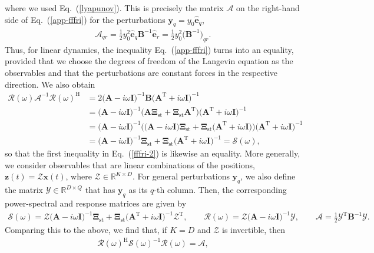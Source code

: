 \documentclass[aps,pre,twocolumn,superscriptaddress,notitlepage]{revtex4-2}
\newcommand{\nn}{\nonumber \\}
\newcommand{\n}{\nonumber}
\newcommand{\bmc}[1]{\bm{\mathcal{#1}}}
\renewcommand{\eqref}[1]{Eq.~(\ref{#1})}
\begin{document}
where we used \eqref{lyapunov}.
This is precisely the matrix $\bmc{A}$ on the right-hand side of \eqref{app-fffri} for the perturbations $\bm{y}_q = y_0 \hat{\bm{e}}_q$,
\begin{align}
\mathcal{A}_{qr} = \frac{1}{2} y_0^2 \hat{\bm{e}}_q \bm{B}^{-1} \hat{\bm{e}}_r = \frac{1}{2} y_0^2 \big(\bm{B}^{-1}\big)_{qr} .
\end{align}
Thus, for linear dynamics, the inequality \eqref{app-fffri} turns into an equality, provided that we choose the degrees of freedom of the Langevin equation as the observables and that the perturbations are constant forces in the respective direction.
We also obtain
\begin{align}
\bmc{R}(\omega) \bmc{A}^{-1} \bmc{R}(\omega)^\text{H} &= 2 \big(\bm{A} - i \omega \bm{I} \big)^{-1} \bm{B} \big(\bm{A}^\text{T} + i \omega \bm{I} \big)^{-1} \label{response-equality-3} \\
&= \big(\bm{A} - i \omega \bm{I} \big)^{-1} \big( \bm{A} \bm{\Xi}_\text{st} + \bm{\Xi}_\text{st} \bm{A}^\text{T} \big) \big(\bm{A}^\text{T} + i \omega \bm{I} \big)^{-1} \nn
&= \big(\bm{A} - i \omega \bm{I} \big)^{-1} \Big( \big(\bm{A} - i \omega \bm{I} \big) \bm{\Xi}_\text{st} + \bm{\Xi}_\text{st} \big(\bm{A}^\text{T} + i \omega \bm{I} \big) \Big) \big(\bm{A}^\text{T} + i \omega \bm{I} \big)^{-1} \nn
&= \big( \bm{A} - i \omega \bm{I}\big)^{-1} \bm{\Xi}_\text{st} + \bm{\Xi}_\text{st} \big( \bm{A}^\text{T} + i \omega \bm{I}\big)^{-1} = \bmc{S}(\omega) \n ,
\end{align}
so that the first inequality in \eqref{fffri-2} is likewise an equality.
More generally, we consider observables that are linear combinations of the positions, $\bm{z}(t) = \bmc{Z} \bm{x}(t)$, where $\bmc{Z} \in \mathbb{R}^{K \times D}$.
For general perturbations $\bm{y}_q$, we also define the matrix $\bmc{Y} \in \mathbb{R}^{D \times Q}$ that has $\bm{y}_q$ as its $q$-th column.
Then, the corresponding power-spectral and response matrices are given by
\begin{align}
\bmc{S}(\omega) = \bmc{Z} \big( \bm{A} - i \omega \bm{I}\big)^{-1} \bm{\Xi}_\text{st} + \bm{\Xi}_\text{st} \big( \bm{A}^\text{T} + i \omega \bm{I}\big)^{-1} \bmc{Z}^\text{T}, \qquad \bmc{R}(\omega) = \bmc{Z} \big(\bm{A} - i \omega \bm{I} \big)^{-1} \bmc{Y}, \qquad \bmc{A} = \frac{1}{2} \bmc{Y}^\text{T} \bm{B}^{-1} \bmc{Y} .
\end{align}
Comparing this to the above, we find that, if $K = D$ and $\bmc{Z}$ is invertible, then
\begin{align}
\bmc{R}(\omega)^\text{H} \bmc{S}(\omega)^{-1} \bmc{R}(\omega) = \bmc{A},
\end{align}
\end{document}

